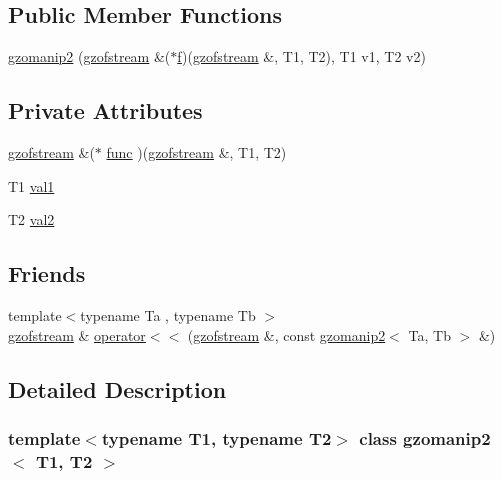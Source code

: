 \subsection*{Public Member Functions}
\begin{DoxyCompactItemize}
\item 
\mbox{\hyperlink{classgzomanip2_a6e3980ce2fa39e29ecfa537bb8e9ddb0}{gzomanip2}} (\mbox{\hyperlink{classgzofstream}{gzofstream}} \&($\ast$\mbox{\hyperlink{isa-arm_8c_a362077c979b0bb65159c603270e40f70}{f}})(\mbox{\hyperlink{classgzofstream}{gzofstream}} \&, T1, T2), T1 v1, T2 v2)
\end{DoxyCompactItemize}
\subsection*{Private Attributes}
\begin{DoxyCompactItemize}
\item 
\mbox{\hyperlink{classgzofstream}{gzofstream}} \&($\ast$ \mbox{\hyperlink{classgzomanip2_a3be14c9a45a72cc79d255dfd5a005c70}{func}} )(\mbox{\hyperlink{classgzofstream}{gzofstream}} \&, T1, T2)
\item 
T1 \mbox{\hyperlink{classgzomanip2_adf61921aa92449ff5ff148c44cce6f60}{val1}}
\item 
T2 \mbox{\hyperlink{classgzomanip2_a8a368527f4551da8f107df6043c9fbf5}{val2}}
\end{DoxyCompactItemize}
\subsection*{Friends}
\begin{DoxyCompactItemize}
\item 
{\footnotesize template$<$typename Ta , typename Tb $>$ }\\\mbox{\hyperlink{classgzofstream}{gzofstream}} \& \mbox{\hyperlink{classgzomanip2_a2382d2b86b2af773d17c2bc349fddb4f}{operator$<$$<$}} (\mbox{\hyperlink{classgzofstream}{gzofstream}} \&, const \mbox{\hyperlink{classgzomanip2}{gzomanip2}}$<$ Ta, Tb $>$ \&)
\end{DoxyCompactItemize}


\subsection{Detailed Description}
\subsubsection*{template$<$typename T1, typename T2$>$\newline
class gzomanip2$<$ T1, T2 $>$}

